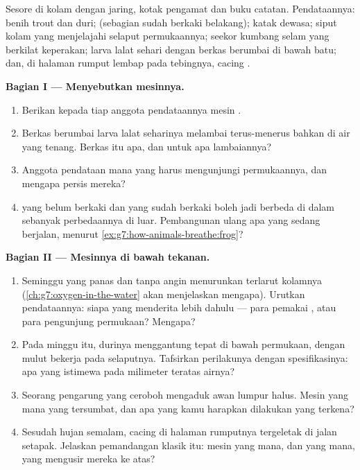 \begin{problem}\label{pb:g7:how-animals-breathe:1}
Sesore di kolam dengan jaring, kotak pengamat dan buku catatan.
Pendataannya: benih  trout dan  duri;  (sebagian sudah
berkaki belakang); katak dewasa; siput kolam yang menjelajahi selaput
permukaannya; seekor kumbang selam yang berkilat keperakan; larva
lalat sehari dengan berkas berumbai di bawah batu; dan, di halaman
rumput lembap pada tebingnya, cacing .

\medskip\noindent\textbf{Bagian I --- Menyebutkan mesinnya.}
\begin{enumerate}
  \item Berikan kepada tiap anggota pendataannya mesin .
  \item Berkas berumbai larva lalat seharinya melambai terus-menerus
        bahkan di air yang tenang. Berkas itu apa, dan untuk apa
        lambaiannya?
  \item Anggota pendataan mana yang harus mengunjungi permukaannya, dan
        mengapa persis mereka?
  \item {} yang belum berkaki dan yang sudah berkaki boleh jadi
        berbeda di dalam sebanyak perbedaannya di luar. Pembangunan
        ulang apa yang sedang berjalan, menurut
        \cref{ex:g7:how-animals-breathe:frog}?
\end{enumerate}

\medskip\noindent\textbf{Bagian II --- Mesinnya di bawah
tekanan.}
\begin{enumerate}[resume]
  \item Seminggu yang panas dan tanpa angin menurunkan 
        terlarut kolamnya (\cref{ch:g7:oxygen-in-the-water} akan
        menjelaskan mengapa). Urutkan pendataannya: siapa yang
        menderita lebih dahulu --- para pemakai , atau para
        pengunjung permukaan? Mengapa?
  \item Pada minggu itu,  durinya menggantung tepat di bawah
        permukaan, dengan mulut bekerja pada selaputnya. Tafsirkan
        perilakunya dengan spesifikasinya: apa yang istimewa pada
        milimeter teratas airnya?
  \item Seorang pengarung yang ceroboh mengaduk awan lumpur halus.
        Mesin yang mana yang tersumbat, dan apa yang kamu harapkan
        dilakukan  yang terkena?
  \item Sesudah hujan semalam, cacing  di halaman rumputnya
        tergeletak di jalan setapak. Jelaskan pemandangan klasik itu:
        mesin yang mana, dan  yang mana, yang mengusir mereka ke
        atas?
\end{enumerate}


\end{problem}
